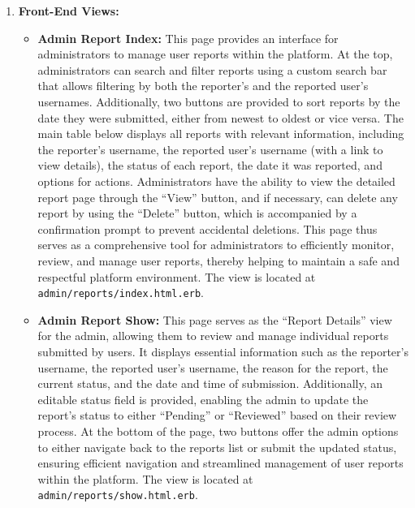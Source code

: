 \begin{enumerate}
        \newpage
        \item \textbf{Front-End Views:}
        \begin{itemize}
            \item \textbf{Admin Report Index:} 
            This page provides an interface for administrators to manage user reports within the platform. At the top, administrators can search and filter reports using a custom search bar that allows filtering by both the reporter’s and the reported user’s usernames. Additionally, two buttons are provided to sort reports by the date they were submitted, either from newest to oldest or vice versa. The main table below displays all reports with relevant information, including the reporter’s username, the reported user’s username (with a link to view details), the status of each report, the date it was reported, and options for actions. Administrators have the ability to view the detailed report page through the “View” button, and if necessary, can delete any report by using the “Delete” button, which is accompanied by a confirmation prompt to prevent accidental deletions. This page thus serves as a comprehensive tool for administrators to efficiently monitor, review, and manage user reports, thereby helping to maintain a safe and respectful platform environment. The view is located at \texttt{admin/reports/index.html.erb}.
            
            \item \textbf{Admin Report Show:}  
            This page serves as the “Report Details” view for the admin, allowing them to review and manage individual reports submitted by users. It displays essential information such as the reporter’s username, the reported user’s username, the reason for the report, the current status, and the date and time of submission. Additionally, an editable status field is provided, enabling the admin to update the report’s status to either “Pending” or “Reviewed” based on their review process. At the bottom of the page, two buttons offer the admin options to either navigate back to the reports list or submit the updated status, ensuring efficient navigation and streamlined management of user reports within the platform.
            The view is located at \texttt{admin/reports/show.html.erb}.
            

\end{itemize}
\end{enumerate}
